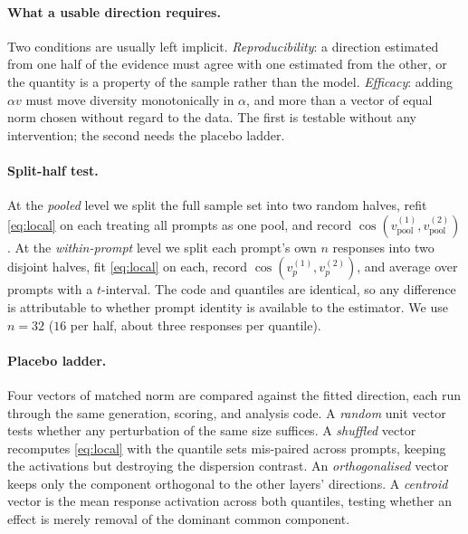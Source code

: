 \paragraph{What a usable direction requires.}
Two conditions are usually left implicit. \emph{Reproducibility}: a direction estimated from one
half of the evidence must agree with one estimated from the other, or the quantity is a property of
the sample rather than the model. \emph{Efficacy}: adding $\alpha v$ must move diversity
monotonically in $\alpha$, and more than a vector of equal norm chosen without regard to the data.
The first is testable without any intervention; the second needs the placebo ladder.

\paragraph{Split-half test.}
At the \emph{pooled} level we split the full sample set into two random halves, refit
\eqref{eq:local} on each treating all prompts as one pool, and record
$\cos(v^{(1)}_{\text{pool}}, v^{(2)}_{\text{pool}})$. At the \emph{within-prompt} level we split
each prompt's own $n$ responses into two disjoint halves, fit \eqref{eq:local} on each, record
$\cos(v_p^{(1)}, v_p^{(2)})$, and average over prompts with a $t$-interval. The code and quantiles
are identical, so any difference is attributable to whether prompt identity is available to the
estimator. We use $n=32$ ($16$ per half, about three responses per quantile).

\paragraph{Placebo ladder.}
Four vectors of matched norm are compared against the fitted direction, each run through the same
generation, scoring, and analysis code. A \emph{random} unit vector tests whether any perturbation
of the same size suffices. A \emph{shuffled} vector recomputes \eqref{eq:local} with the quantile
sets mis-paired across prompts, keeping the activations but destroying the dispersion contrast. An
\emph{orthogonalised} vector keeps only the component orthogonal to the other layers' directions.
A \emph{centroid} vector is the mean response activation across both quantiles, testing whether an
effect is merely removal of the dominant common component.

